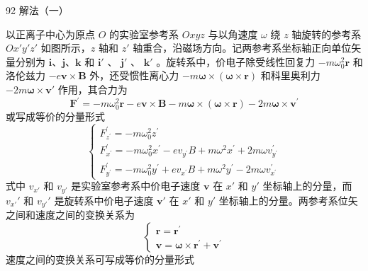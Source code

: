 \begin{solution}{92}
解法（一）
\begin{subsolution}
以正离子中心为原点 $O$ 的实验室参考系 $Oxyz$ 与以角速度 $\omega$ 绕 $z$ 轴旋转的参考系 $Ox'y'z'$ 如图所示，$z$ 轴和 $z'$ 轴重合，沿磁场方向。记两参考系坐标轴正向单位矢量分别为 $\boldsymbol{i}$、$\boldsymbol{j}$、$\boldsymbol{k}$ 和 $\boldsymbol{i}'$ 、 $\boldsymbol{j}'$ 、 $\boldsymbol{k}'$ 。旋转系中，价电子除受线性回复力 $-m\omega_{0}^{2}\boldsymbol{r}$ 和洛伦兹力 $-e\boldsymbol{v}\times\boldsymbol{B}$ 外，还受惯性离心力 $-m\boldsymbol{\omega}\times(\boldsymbol{\omega}\times\boldsymbol{r})$ 和科里奥利力 $-2m\boldsymbol{\omega}\times\boldsymbol{v}'$ 作用，其合力为
\begin{equation}
\boldsymbol {F} ^ {\prime} = - m \omega_ {0} ^ {2} \boldsymbol {r} - e \boldsymbol {v} \times \boldsymbol {B} - m \boldsymbol {\omega} \times (\boldsymbol {\omega} \times \boldsymbol {r}) - 2 m \boldsymbol {\omega} \times \boldsymbol {v} ^ {\prime}
\label{eq:1.s92}
\end{equation}
或写成等价的分量形式
\begin{equation}
\left\{ \begin{array}{l} F _ {z ^ {\prime}} ^ {\prime} = - m \omega_ {0} ^ {2} z ^ {\prime} \\ F _ {x ^ {\prime}} ^ {\prime} = - m \omega_ {0} ^ {2} x ^ {\prime} - e v _ {y ^ {\prime}} B + m \omega^ {2} x ^ {\prime} + 2 m \omega v _ {y ^ {\prime}} ^ {\prime} \\ F _ {y ^ {\prime}} ^ {\prime} = - m \omega_ {0} ^ {2} y ^ {\prime} + e v _ {x ^ {\prime}} B + m \omega^ {2} y ^ {\prime} - 2 m \omega v _ {x ^ {\prime}} ^ {\prime} \end{array} \right.
\label{eq:2.s92}
\end{equation}
式中 $v_{x'}$ 和 $v_{y'}$ 是实验室参考系中价电子速度 $\boldsymbol{v}$ 在 $x'$ 和 $y'$ 坐标轴上的分量，而 $v_{x'}'$ 和 $v_{y'}'$ 是旋转系中价电子速度 $\boldsymbol{v}'$ 在 $x'$ 和 $y'$ 坐标轴上的分量。两参考系位矢之间和速度之间的变换关系为
\begin{equation}
\left\{ \begin{array}{l} \boldsymbol {r} = \boldsymbol {r} ^ {\prime} \\ \boldsymbol {v} = \boldsymbol {\omega} \times \boldsymbol {r} ^ {\prime} + \boldsymbol {v} ^ {\prime} \end{array} \right.
\label{eq:3.s92}
\end{equation}
速度之间的变换关系可写成等价的分量形式
\begin{equation}

\end{equation}
\end{subsolution}
\end{solution}
